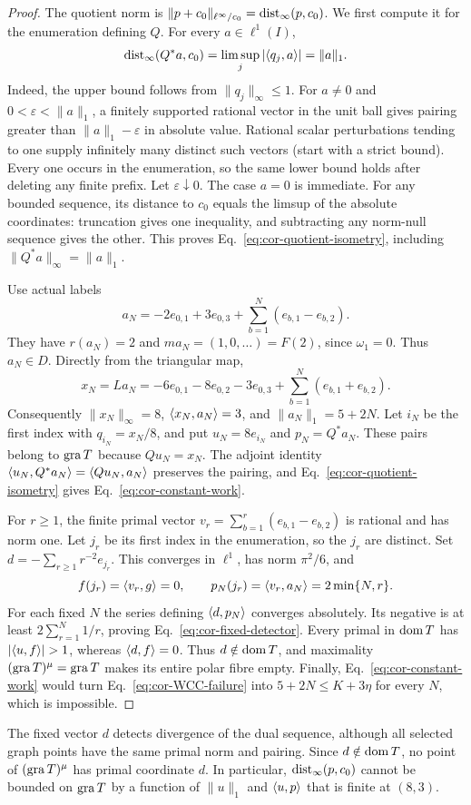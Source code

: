 \begin{proof}
The quotient norm is $\|p+c_0\|_{\ell^\infty/c_0}=\operatorname{dist}_\infty(p,c_0)$.
We first compute it for the enumeration defining $Q$.
For every $a\in\ell^1(I)$,
\begin{equation}
\operatorname{dist}_{\infty}(Q^*a,c_0)
=\limsup_j|\langle q_j,a\rangle|=\|a\|_1.
\label{eq:cor-quotient-isometry}
\end{equation}
Indeed, the upper bound follows from $\|q_j\|_\infty\le1$. For
$a\ne0$ and $0<\varepsilon<\|a\|_1$, a finitely supported rational
vector in the unit ball gives pairing greater than
$\|a\|_1-\varepsilon$ in absolute value. Rational scalar perturbations
tending to one supply infinitely many distinct such vectors (start
with a strict bound). Every one occurs in the enumeration, so the
same lower bound holds after deleting any finite prefix. Let
$\varepsilon\downarrow0$. The case $a=0$ is immediate. For any bounded
sequence, its distance to $c_0$ equals the limsup of the absolute
coordinates: truncation gives one inequality, and subtracting any
norm-null sequence gives the other. This proves
Eq.~\eqref{eq:cor-quotient-isometry}, including
$\|Q^*a\|_\infty=\|a\|_1$.

Use actual labels
\[
a_N=-2e_{0,1}+3e_{0,3}
       +\sum_{b=1}^N(e_{b,1}-e_{b,2}).
\]
They have $r(a_N)=2$ and $ma_N=(1,0,\ldots)=F(2)$, since
$\omega_1=0$. Thus $a_N\in D$. Directly from the triangular map,
\[
x_N=La_N=-6e_{0,1}-8e_{0,2}-3e_{0,3}
                  +\sum_{b=1}^N(e_{b,1}+e_{b,2}).
\]
Consequently $\|x_N\|_\infty=8$, $\langle x_N,a_N\rangle=3$, and
$\|a_N\|_1=5+2N$. Let $i_N$ be the first index with
$q_{i_N}=x_N/8$, and put $u_N=8e_{i_N}$ and $p_N=Q^*a_N$.
These pairs belong to $\operatorname{gra} T$ because $Qu_N=x_N$. The adjoint identity
$\langle u_N,Q^*a_N\rangle=\langle Qu_N,a_N\rangle$ preserves the pairing,
and Eq.~\eqref{eq:cor-quotient-isometry} gives
Eq.~\eqref{eq:cor-constant-work}.

For $r\ge1$, the finite primal vector
$v_r=\sum_{b=1}^r(e_{b,1}-e_{b,2})$ is rational and has norm one.
Let $j_r$ be its first index in the enumeration, so the $j_r$ are
distinct. Set $d=-\sum_{r\ge1}r^{-2}e_{j_r}$. This converges in
$\ell^1$, has norm $\pi^2/6$, and
\[
f(j_r)=\langle v_r,g\rangle=0,\qquad
p_N(j_r)=\langle v_r,a_N\rangle=2\min\{N,r\}.
\]
For each fixed $N$ the series defining $\langle d,p_N\rangle$ converges
absolutely. Its negative is at least
$2\sum_{r=1}^N1/r$, proving Eq.~\eqref{eq:cor-fixed-detector}.
Every primal in $\operatorname{dom} T$ has $|\pair{u}{f}|>1$, whereas
$\langle d,f\rangle=0$. Thus $d\notin\operatorname{dom} T$, and maximality
$(\operatorname{gra} T)^\mu=\operatorname{gra} T$ makes its entire polar fibre empty.
Finally, Eq.~\eqref{eq:cor-constant-work} would turn
Eq.~\eqref{eq:cor-WCC-failure} into $5+2N\le K+3\eta$ for every
$N$, which is impossible.
\end{proof}
The fixed vector $d$ detects divergence of the dual sequence, although
all selected graph points have the same primal norm and pairing.
Since $d\notin\operatorname{dom} T$, no point of $(\operatorname{gra} T)^\mu$ has primal coordinate
$d$. In particular, $\operatorname{dist}_\infty(p,c_0)$ cannot be bounded on $\operatorname{gra} T$
by a function of $\|u\|_1$ and $\langle u,p\rangle$ that is finite at $(8,3)$.

